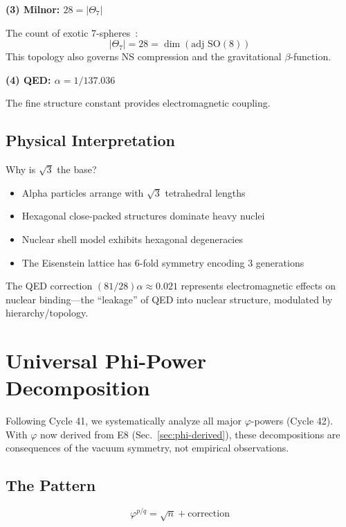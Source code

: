 \documentclass[aps,prd,twocolumn,superscriptaddress,floatfix,nofootinbib]{revtex4-2}
\theoremstyle{definition}
\theoremstyle{remark}
\newcommand{\vp}{\varphi}
\newcommand{\Th}{\Theta}
\begin{document}
\textbf{(3) Milnor: $28 = |\Th_7|$}

The count of exotic 7-spheres~\cite{milnor}:
\begin{equation}
|\Th_7| = 28 = \dim(\text{adj SO}(8))
\end{equation}
This topology also governs NS compression and the gravitational $\beta$-function.

\textbf{(4) QED: $\alpha = 1/137.036$}

The fine structure constant provides electromagnetic coupling.

\subsection{Physical Interpretation}

Why is $\sqrt{3}$ the base?

\begin{itemize}
\item Alpha particles arrange with $\sqrt{3}$ tetrahedral lengths
\item Hexagonal close-packed structures dominate heavy nuclei
\item Nuclear shell model exhibits hexagonal degeneracies
\item The Eisenstein lattice has 6-fold symmetry encoding 3 generations
\end{itemize}

The QED correction $(81/28)\alpha \approx 0.021$ represents electromagnetic effects on nuclear binding---the ``leakage'' of QED into nuclear structure, modulated by hierarchy/topology.

\section{Universal Phi-Power Decomposition}
\label{sec:sqrt-n}

Following Cycle 41, we systematically analyze all major $\vp$-powers (Cycle 42). With $\vp$ now derived from E8 (Sec.~\ref{sec:phi-derived}), these decompositions are consequences of the vacuum symmetry, not empirical observations.

\subsection{The Pattern}

\begin{equation}
\vp^{p/q} = \sqrt{n} + \text{correction}
\end{equation}
\end{document}
